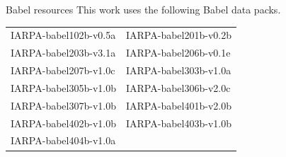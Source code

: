 \documentclass[12pt,xcolor=dvipsnames]{beamer}
\begin{document}
\begin{frame}{Babel resources}{}
  This work uses the following Babel data packs.
  \vfill
  \centering
  \begin{tabular}{@{}ll@{}}
    IARPA-babel102b-v0.5a & IARPA-babel201b-v0.2b \\
    IARPA-babel203b-v3.1a & IARPA-babel206b-v0.1e \\
    IARPA-babel207b-v1.0c & IARPA-babel303b-v1.0a \\
    IARPA-babel305b-v1.0b & IARPA-babel306b-v2.0c \\
    IARPA-babel307b-v1.0b & IARPA-babel401b-v2.0b \\
    IARPA-babel402b-v1.0b & IARPA-babel403b-v1.0b \\
    IARPA-babel404b-v1.0a & \\
  \end{tabular}
\end{frame}


\end{document}
